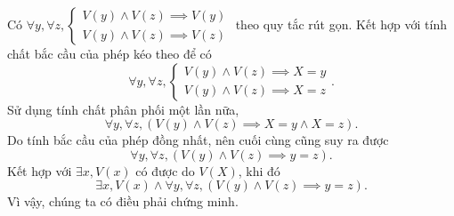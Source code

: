 Có $\forall y, \forall z, \begin{cases}
   V(y) \land V(z) \implies V(y) \\
   V(y) \land V(z) \implies V(z)
\end{cases}$ theo quy tắc rút gọn. Kết hợp với tính chất bắc cầu của phép kéo theo để có \begin{equation*}
   \forall y, \forall z, \begin{cases}
      V(y) \land V(z) \implies X = y \\
      V(y) \land V(z) \implies X = z
   \end{cases}.
\end{equation*}
Sử dụng tính chất phân phối một lần nữa, \begin{equation*}
   \forall y, \forall z, (V(y) \land V(z) \implies X = y \land X = z).
\end{equation*}
Do tính bắc cầu của phép đồng nhất, nên cuối cùng cũng suy ra được \begin{equation*}
   \forall y, \forall z, (V(y) \land V(z) \implies y = z).
\end{equation*}
Kết hợp với $\exists x, V(x)$ có được do $V(X)$, khi đó \begin{equation*}
   \exists x, V(x) \land \forall y, \forall z, (V(y) \land V(z) \implies y = z).
\end{equation*}
Vì vậy, chúng ta có điều phải chứng minh.
